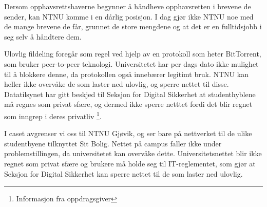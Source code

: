 Dersom opphavsrettshaverne begynner å håndheve opphavsretten i brevene de sender, kan NTNU komme i en dårlig posisjon. I dag gjør ikke NTNU noe med de mange brevene de får, grunnet de store mengdene og at det er en fulltidsjobb i seg selv å håndtere dem.

Ulovlig fildeling foregår som regel ved hjelp av en protokoll som heter BitTorrent, som bruker peer-to-peer teknologi. Universitetet har per dags dato ikke mulighet til å blokkere denne, da protokollen også innebærer legitimt bruk. NTNU kan heller ikke overvåke de som laster ned ulovlig, og sperre nettet til disse. Datatilsynet har gitt beskjed til Seksjon for Digital Sikkerhet at studenthyblene må regnes som privat sfære, og dermed ikke sperre netttet fordi det blir regnet som inngrep i deres privatliv \footnote{Informasjon fra oppdragsgiver}.

I caset avgrenser vi oss til NTNU Gjøvik, og ser bare på nettverket til de ulike studentbyene tilknyttet Sit Bolig. Nettet på campus faller ikke under problemstillingen, da universitetet kan overvåke dette. Universitetsnettet blir ikke regnet som privat sfære og brukere må holde seg til IT-reglementet, som gjør at Seksjon for Digital Sikkerhet kan sperre nettet til de som laster ned ulovlig.